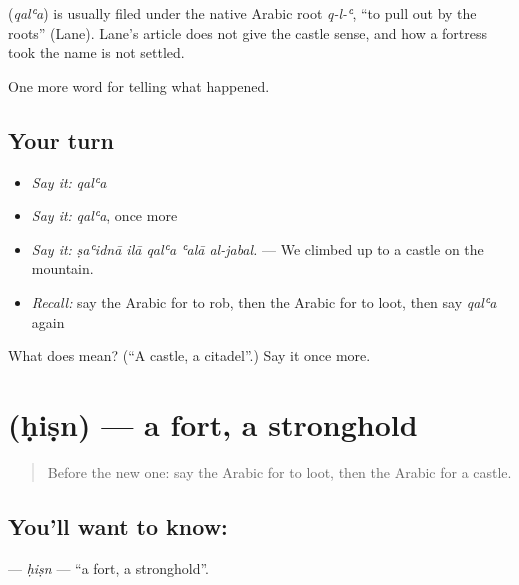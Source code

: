 \begin{cousinweb}
\textbf{} (\emph{qalʿa}) is usually filed under the native Arabic root \emph{q-l-ʿ}, \textquotedblleft{}to pull out by the roots\textquotedblright{} (Lane). Lane's article does not give the castle sense, and how a fortress took the name is not settled.
\end{cousinweb}

\begin{grammarlens}[title={What you've built}]
One more word for telling what happened.
\end{grammarlens}

\subsection*{Your turn}
\begin{itemize}
\raggedright
  \item \emph{Say it:} \emph{qalʿa}
  \item \emph{Say it:} \emph{qalʿa}, once more
  \item \emph{Say it:} \emph{ṣaʿidnā ilā qalʿa ʿalā al-jabal.} — We climbed up to a castle on the mountain.
  \item \emph{Recall:} say the Arabic for to rob, then the Arabic for to loot, then say \emph{qalʿa} again
\end{itemize}

\begin{tcolorbox}[breakable,colback=teal!4,colframe=teal!35!black,title={Before you move on}]
What does  mean? (\textquotedblleft{}A castle, a citadel\textquotedblright{}.) Say it once more.
\end{tcolorbox}
\section[\texorpdfstring{\ar{حصن} (ḥiṣn)}{حصن (ḥiṣn)}]{ (ḥiṣn) — a fort, a stronghold}

\label{lesson:AR-C322-hisn}



\begin{quote}
Before the new one: say the Arabic for to loot, then the Arabic for a castle.
\end{quote}

\subsection*{You'll want to know: }
\textbf{} — \emph{ḥiṣn} — \textquotedblleft{}a fort, a stronghold\textquotedblright{}.

